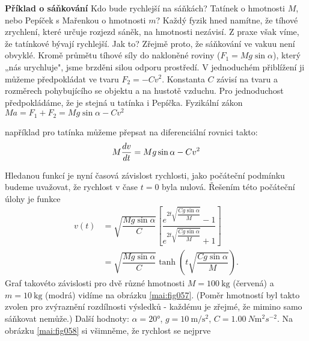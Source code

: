 \begin{mdframed}[style=mdexam]
  \begin{example}\label{mai:exam086}
    \textbf{Příklad o sáňkování}\newline
    Kdo bude rychlejší na sáňkách? Tatínek o hmotnosti \(M\), nebo Pepíček s Mařenkou o hmotnosti
    \(m\)? Každý fyzik hned namítne, že tíhové zrychlení, které určuje rozjezd sáněk, na hmotnosti
    nezávisí. Z praxe však víme, že tatínkové bývají rychlejší. Jak to? Zřejmě proto, že sáňkování
    ve vakuu není obvyklé. Kromě průmětu tíhové síly do nakloněné roviny (\(F_1 = Mg\sin\alpha\)),
    který „nás urychluje", jsme brzděni silou odporu prostředí. V jednoduchém přiblížení ji můžeme
    předpokládat ve tvaru \(F_2 = -Cv^2\). Konstanta \(C\) závisí na tvaru a rozměrech pohybujícího
    se objektu a na hustotě vzduchu. Pro jednoduchost předpokládáme, že je stejná u tatínka i
    Pepíčka. Fyzikální zákon \(Ma= F_1 + F_2 = Mg\sin\alpha - Cv^2\)

    {\centering
    \captionsetup{type=figure}
    \label{mai:fig057}
    \par}

    například pro tatínka můžeme přepsat na diferenciální rovnici takto:
    \begin{equation}\label{mai:eq079}
      M\dfrac{d v}{d t} = Mg\sin\alpha - Cv^2
    \end{equation}
    
    Hledanou funkcí je nyní časová závislost rychlosti, jako počáteční podmínku budeme uvažovat, že
    rychlost v čase \(t = 0\) byla nulová. Řešením této počáteční úlohy je funkce
    \begin{align*}
      v(t) &= \sqrt{\dfrac{Mg\sin\alpha}{C}}
              \left[\dfrac{e^{2t\sqrt{\dfrac{Cg\sin\alpha}{M}}}-1}
                          {e^{2t\sqrt{\dfrac{Cg\sin\alpha}{M}}}+1}
              \right]                                                                           \\
          &= \sqrt{\dfrac{Mg\sin\alpha}{C}}\tanh\left(t\sqrt{\dfrac{Cg\sin\alpha}{M}}\right).
    \end{align*}
    Graf takovéto závislosti pro dvě různé hmotnosti \(M = \SI{100}{\kg}\) (červená) a \(m =\SI{10}
    {\kg}\) (modrá) vidíme na obrázku \ref{mai:fig057}. (Poměr hmotností byl takto zvolen pro
    zvýraznění rozdílnosti výsledků - každému je zřejmé, že mimino samo sáňkovat nemůže.) Další
    hodnoty: \(\alpha = \ang{20}\), \(g = \SI{10}{\m\per\square\s}\), \(C =
    \SI{1.00}{N\m^2s^{-2}}\). Na obrázku \ref{mai:fig058} si všimněme, že rychlost se nejprve


\end{example}
\end{mdframed}
